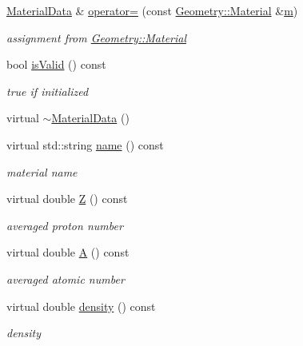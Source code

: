 \begin{DoxyCompactItemize}
\hyperlink{class_d_d4hep_1_1_d_d_rec_1_1_material_data}{Material\+Data} \& \hyperlink{class_d_d4hep_1_1_d_d_rec_1_1_material_data_acd13fcfbed46538127af9d018960e906}{operator=} (const \hyperlink{class_d_d4hep_1_1_geometry_1_1_material}{Geometry\+::\+Material} \&\hyperlink{_volumes_8cpp_a6fc379aaec47ce424b00d8ffda2a6c59}{m})
\begin{DoxyCompactList}\small\item\em assignment from \hyperlink{class_d_d4hep_1_1_geometry_1_1_material}{Geometry\+::\+Material} \end{DoxyCompactList}\item 
bool \hyperlink{class_d_d4hep_1_1_d_d_rec_1_1_material_data_a143de076ff337b20c79be079294c2942}{is\+Valid} () const
\begin{DoxyCompactList}\small\item\em true if initialized \end{DoxyCompactList}\item 
virtual \hyperlink{class_d_d4hep_1_1_d_d_rec_1_1_material_data_af8e5c9f475adfaef01379519c9e92929}{$\sim$\+Material\+Data} ()
\item 
virtual std\+::string \hyperlink{class_d_d4hep_1_1_d_d_rec_1_1_material_data_a9e78435056d6908a5521176548461cc2}{name} () const
\begin{DoxyCompactList}\small\item\em material name \end{DoxyCompactList}\item 
virtual double \hyperlink{class_d_d4hep_1_1_d_d_rec_1_1_material_data_a8200577f3cab334549373e0dfcc3db3a}{Z} () const
\begin{DoxyCompactList}\small\item\em averaged proton number \end{DoxyCompactList}\item 
virtual double \hyperlink{class_d_d4hep_1_1_d_d_rec_1_1_material_data_a34cd03ee817287d200cf55fc74cbcb54}{A} () const
\begin{DoxyCompactList}\small\item\em averaged atomic number \end{DoxyCompactList}\item 
virtual double \hyperlink{class_d_d4hep_1_1_d_d_rec_1_1_material_data_ad914f7bb89899a8e23bc927574b54b61}{density} () const
\begin{DoxyCompactList}\small\item\em density \end{DoxyCompactList}\item 

\end{DoxyCompactItemize}
